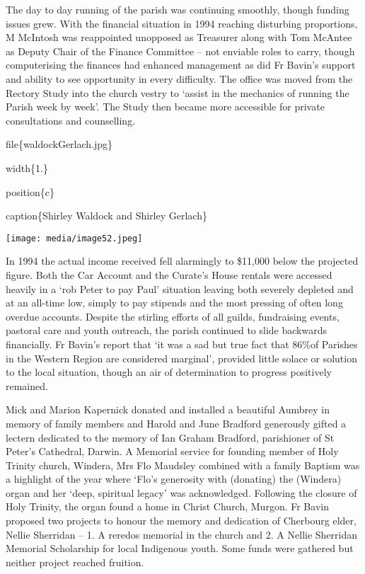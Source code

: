 The day to day running of the parish was continuing smoothly, though funding issues grew. With the financial situation in 1994 reaching disturbing proportions, M McIntosh was reappointed unopposed as Treasurer along with Tom McAntee as Deputy Chair of the Finance Committee -- not enviable roles to carry, though computerising the finances had enhanced management as did Fr Bavin's support and ability to see opportunity in every difficulty. The office was moved from the Rectory Study into the church vestry to `assist in the mechanics of running the Parish week by week'. The Study then became more accessible for private consultations and counselling.

file\{waldockGerlach.jpg\}

width\{1.\}

position\{c\}

caption\{Shirley Waldock and Shirley Gerlach\}

\texttt{[image: media/image52.jpeg]}

In 1994 the actual income received fell alarmingly to \$11,000 below the projected figure. Both the Car Account and the Curate's House rentals were accessed heavily in a `rob Peter to pay Paul' situation leaving both severely depleted and at an all-time low, simply to pay stipends and the most pressing of often long overdue accounts. Despite the stirling efforts of all guilds, fundraising events, pastoral care and youth outreach, the parish continued to slide backwards financially. Fr Bavin's report that `it was a sad but true fact that 86\%of Parishes in the Western Region are considered marginal', provided little solace or solution to the local situation, though an air of determination to progress positively remained.

Mick and Marion Kapernick donated and installed a beautiful Aumbrey in memory of family members and Harold and June Bradford generously gifted a lectern dedicated to the memory of Ian Graham Bradford, parishioner of St Peter's Cathedral, Darwin. A Memorial service for founding member of Holy Trinity church, Windera, Mrs Flo Maudsley combined with a family Baptism was a highlight of the year where `Flo's generosity with (donating) the (Windera) organ and her `deep, spiritual legacy' was acknowledged. Following the closure of Holy Trinity, the organ found a home in Christ Church, Murgon. Fr Bavin proposed two projects to honour the memory and dedication of Cherbourg elder, Nellie Sherridan -- 1. A reredos memorial in the church and 2. A Nellie Sherridan Memorial Scholarship for local Indigenous youth. Some funds were gathered but neither project reached fruition.


